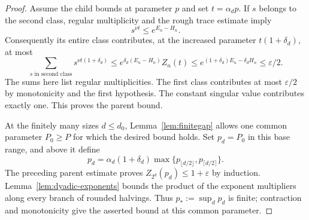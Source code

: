 \begin{proof}
Assume the child bounds at parameter $p$ and set $t=\alpha_dp$.
If $s$ belongs to the second class, regular multiplicity and the
rough trace estimate imply
\[
 s^{\nu t}\le e^{E_n-H_n}.
\]
Consequently its entire class contributes, at the increased parameter
$t(1+\delta_d)$, at most
\[
 \sum_{s\text{ in second class}}s^{\nu t(1+\delta_d)}
 \le e^{\delta_d(E_n-H_n)}Z_n(t)
 \le e^{(1+\delta_d)E_n-\delta_dH_n}
 \le\varepsilon/2.
\]
The sums here list regular multiplicities. The first class contributes
at most $\varepsilon/2$ by monotonicity and the first hypothesis.
The constant singular value contributes exactly one. This proves the
parent bound.

At the finitely many sizes $d\le d_0$, Lemma~\ref{lem:finitegap}
allows one common parameter $P_0\ge P$ for which the desired bound
holds. Set $p_d=P_0$ in this base range, and above it define
\[
 p_d=\alpha_d(1+\delta_d)
       \max\{p_{\lfloor d/2\rfloor},p_{\lceil d/2\rceil}\}.
\]
The preceding parent estimate proves $Z_{2^d}(p_d)\le1+\varepsilon$
by induction. Lemma~\ref{lem:dyadic-exponents} bounds the product
of the exponent multipliers along every branch of rounded halvings.
Thus $p_*:=\sup_d p_d$
is finite; contraction and monotonicity give the asserted bound at
this common parameter.
\end{proof}
